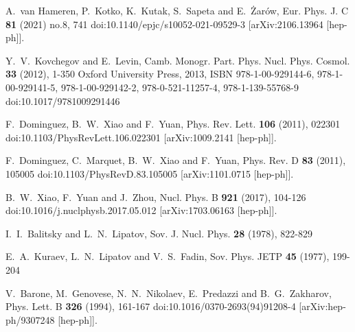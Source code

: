 A.~van Hameren, P.~Kotko, K.~Kutak, S.~Sapeta and E.~\.Zar\'ow,
Eur. Phys. J. C \textbf{81} (2021) no.8, 741
doi:10.1140/epjc/s10052-021-09529-3
[arXiv:2106.13964 [hep-ph]].

Y.~V.~Kovchegov and E.~Levin,
Camb. Monogr. Part. Phys. Nucl. Phys. Cosmol. \textbf{33} (2012), 1-350
Oxford University Press, 2013,
ISBN 978-1-00-929144-6, 978-1-00-929141-5, 978-1-00-929142-2, 978-0-521-11257-4, 978-1-139-55768-9
doi:10.1017/9781009291446

F.~Dominguez, B.~W.~Xiao and F.~Yuan,
Phys. Rev. Lett. \textbf{106} (2011), 022301
doi:10.1103/PhysRevLett.106.022301
[arXiv:1009.2141 [hep-ph]].

F.~Dominguez, C.~Marquet, B.~W.~Xiao and F.~Yuan,
Phys. Rev. D \textbf{83} (2011), 105005
doi:10.1103/PhysRevD.83.105005
[arXiv:1101.0715 [hep-ph]].

B.~W.~Xiao, F.~Yuan and J.~Zhou,
Nucl. Phys. B \textbf{921} (2017), 104-126
doi:10.1016/j.nuclphysb.2017.05.012
[arXiv:1703.06163 [hep-ph]].

I.~I.~Balitsky and L.~N.~Lipatov,
Sov. J. Nucl. Phys. \textbf{28} (1978), 822-829

E.~A.~Kuraev, L.~N.~Lipatov and V.~S.~Fadin,
Sov. Phys. JETP \textbf{45} (1977), 199-204

V.~Barone, M.~Genovese, N.~N.~Nikolaev, E.~Predazzi and B.~G.~Zakharov,
Phys. Lett. B \textbf{326} (1994), 161-167
doi:10.1016/0370-2693(94)91208-4
[arXiv:hep-ph/9307248 [hep-ph]].

